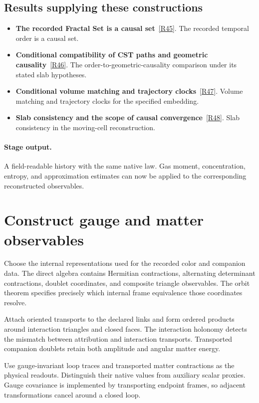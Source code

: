 \documentclass[11pt,a4paper]{article}
\begin{document}
\subsection*{Results supplying these constructions}
\begin{itemize}
\item \textbf{The recorded Fractal Set is a causal set}~\hyperref[src:thm-fractal-is-causal-set]{[R45]}. The recorded temporal order is a causal set.
\item \textbf{Conditional compatibility of CST paths and geometric causality}~\hyperref[src:prop-fractal-causal-order-equivalence]{[R46]}. The order-to-geometric-causality comparison under its stated slab hypotheses.
\item \textbf{Conditional volume matching and trajectory clocks}~\hyperref[src:thm-fractal-faithful-embedding]{[R47]}. Volume matching and trajectory clocks for the specified embedding.
\item \textbf{Slab consistency and the scope of causal convergence}~\hyperref[src:prop-scutoid-cst-compatibility]{[R48]}. Slab consistency in the moving-cell reconstruction.
\end{itemize}
\paragraph{Stage output.} A field-readable history with the same native law. Gas moment, concentration, entropy, and approximation estimates can now be applied to the corresponding reconstructed observables.

\section{Construct gauge and matter observables}
\label{stage:11}
Choose the internal representations used for the recorded color and companion data. The direct algebra contains Hermitian contractions, alternating determinant contractions, doublet coordinates, and composite triangle observables. The orbit theorem specifies precisely which internal frame equivalence those coordinates resolve.

Attach oriented transports to the declared links and form ordered products around interaction triangles and closed faces. The interaction holonomy detects the mismatch between attribution and interaction transports. Transported companion doublets retain both amplitude and angular matter energy.

Use gauge-invariant loop traces and transported matter contractions as the physical readouts. Distinguish their native values from auxiliary scalar proxies. Gauge covariance is implemented by transporting endpoint frames, so adjacent transformations cancel around a closed loop.
\end{document}
